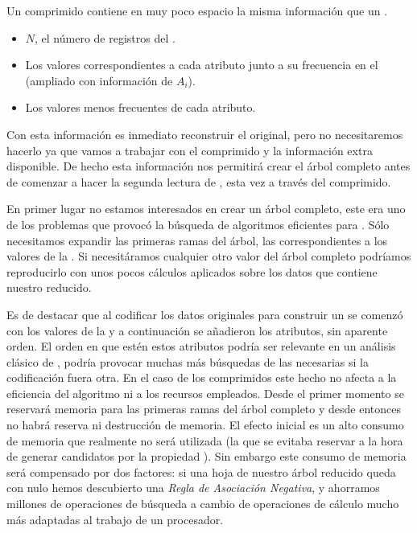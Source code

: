 \ABIERTO







Un \catalogo comprimido contiene en muy poco espacio la misma información que un \catalogo.
\begin{itemize}
   \item $N$, el número de registros del \catalogo.
   \item Los valores correspondientes a cada atributo junto a su frecuencia en el \catalogo (\aprioriC[1] ampliado con información de $A_i$).
   \item Los valores menos frecuentes de cada atributo.
\end{itemize}

Con esta información es inmediato reconstruir el \catalogo original, pero no necesitaremos hacerlo ya que vamos a trabajar con el \catalogo comprimido y la información extra disponible. De hecho esta información nos permitirá crear el árbol \aprioriL completo antes de comenzar a hacer la segunda lectura de \D, esta vez a través del \catalogo comprimido.

En primer lugar no estamos interesados en crear un árbol \aprioriL completo, este era uno de los problemas que provocó la búsqueda de algoritmos eficientes para \ARM. Sólo necesitamos expandir las primeras ramas del árbol, las correspondientes a los valores de la \clase. Si necesitáramos cualquier otro valor del árbol completo podríamos reproducirlo con unos pocos cálculos aplicados sobre los datos que contiene nuestro \aprioriL reducido.

Es de destacar que al codificar los datos originales para construir un \catalogo se comenzó con los valores de la \clase y a continuación se añadieron los atributos, sin aparente orden. El orden en que estén estos atributos podría ser relevante en un análisis clásico de \arm, podría provocar muchas más búsquedas de las necesarias si la codificación fuera otra. En el caso de los \catalogos comprimidos este hecho no afecta a la eficiencia del algoritmo ni a los recursos empleados. Desde el primer momento se reservará memoria para las primeras ramas del árbol \aprioriL completo y desde entonces no habrá reserva ni destrucción de memoria. El efecto inicial es un alto consumo de memoria que realmente no será utilizada (la que se evitaba reservar a la hora de generar candidatos por la propiedad \apriori). Sin embargo este consumo de memoria será compensado por dos factores: si una hoja de nuestro árbol \aprioriL reducido queda con \soporte nulo hemos descubierto una \emph{Regla de Asociación Negativa}, y ahorramos millones de operaciones de búsqueda a cambio de operaciones de cálculo mucho más adaptadas al trabajo de un procesador.








